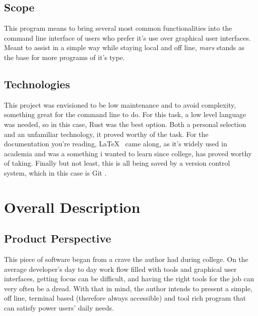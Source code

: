 \documentclass{report}
\begin{document}
\section{Scope}
This program means to bring several most common functionalities into the command line interface of users who prefer it's use over graphical user interfaces. Meant to assist in a simple way while staying local and off line, \emph{mars} stands as the base for more programs of it's type.

\section{Technologies}
This project was envisioned to be low maintenance and to avoid complexity, something great for the command line to do. For this task, a low level language was needed, so in this case, Rust \cite{RustProgrammingLanguage} was the best option. Both a personal selection and an unfamiliar technology, it proved worthy of the task. For the documentation you're reading, \LaTeX\ \cite{LaTeXDocumentPreparation} came along, as it's widely used in academia and was a something i wanted to learn since college, has proved worthy of taking. Finally but not least, this is all being saved by a version control system, which in this case is Git \cite{Git}.

\chapter{Overall Description}
\section{Product Perspective}
This piece of software began from a crave the author had during college. On the average developer's day to day work flow filled with tools and graphical user interfaces, getting focus can be difficult, and having the right tools for the job can very often be a dread. With that in mind, the author intends to present a simple, off line, terminal based (therefore always accessible) and tool rich program that can satisfy power users' daily needs.
\end{document}

